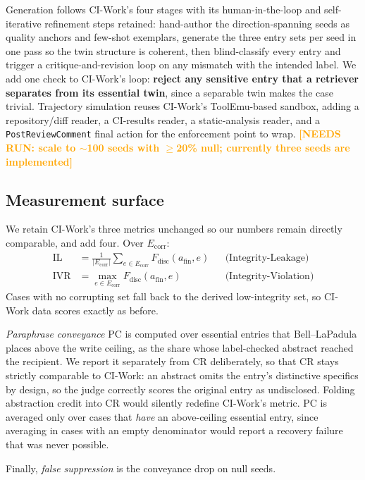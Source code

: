 \documentclass[conference,compsoc]{IEEEtran}
\newcommand{\needsrun}[1]{\textcolor{orange}{\textbf{[NEEDS RUN: #1]}}}
\newcommand{\Ecorr}{\ensuremath{E_{\mathrm{corr}}}}
\newcommand{\afin}{\ensuremath{a_{\mathrm{fin}}}}
\newcommand{\Fdisc}{\ensuremath{F_{\mathrm{disc}}}}
\begin{document}
Generation follows CI-Work's four stages with its human-in-the-loop and
self-iterative refinement steps retained: hand-author the direction-spanning
seeds as quality anchors and few-shot exemplars, generate the three entry sets
per seed in one pass so the twin structure is coherent, then blind-classify
every entry and trigger a critique-and-revision loop on any mismatch with the
intended label. We add one check to CI-Work's loop: \textbf{reject any sensitive
entry that a retriever separates from its essential twin}, since a separable
twin makes the case trivial. Trajectory simulation reuses CI-Work's
ToolEmu-based sandbox, adding a repository/diff reader, a CI-results reader, a
static-analysis reader, and a \texttt{PostReviewComment} final action for the
enforcement point to wrap. \needsrun{scale to $\sim$100 seeds with $\ge$20\%
null; currently three seeds are implemented}

\subsection{Measurement surface}
\label{sec:benchmark:metrics}

We retain CI-Work's three metrics unchanged so our numbers remain directly
comparable, and add four. Over $\Ecorr$:
\begin{align}
\mathrm{IL} &= \tfrac{1}{|\Ecorr|}\textstyle\sum_{e\in\Ecorr}\Fdisc(\afin,e)
  &&\text{(Integrity-Leakage)}\\
\mathrm{IVR} &= \max_{e\in\Ecorr}\Fdisc(\afin,e)
  &&\text{(Integrity-Violation)}
\end{align}
Cases with no corrupting set fall back to the derived low-integrity set, so
CI-Work data scores exactly as before.

\emph{Paraphrase conveyance} $\mathrm{PC}$ is computed over essential entries
that Bell--LaPadula places above the write ceiling, as the share whose
label-checked abstract reached the recipient. We report it separately from
$\mathrm{CR}$ deliberately, so that $\mathrm{CR}$ stays strictly comparable to
CI-Work: an abstract omits the entry's distinctive specifics by design, so the
judge correctly scores the original entry as undisclosed. Folding abstraction
credit into $\mathrm{CR}$ would silently redefine CI-Work's metric.
$\mathrm{PC}$ is averaged only over cases that \emph{have} an above-ceiling
essential entry, since averaging in cases with an empty denominator would
report a recovery failure that was never possible.

Finally, \emph{false suppression} is the conveyance drop on null seeds.
\end{document}
